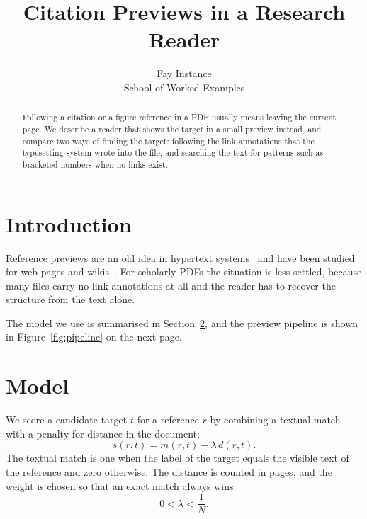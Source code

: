 \title{Citation Previews in a Research Reader}
\author{Fay Instance\\ School of Worked Examples}
\date{}


\maketitle

\begin{abstract}
Following a citation or a figure reference in a PDF usually means leaving the
current page. We describe a reader that shows the target in a small preview
instead, and compare two ways of finding the target: following the link
annotations that the typesetting system wrote into the file, and searching the
text for patterns such as bracketed numbers when no links exist.
\end{abstract}

\section{Introduction}\label{sec:intro}

Reference previews are an old idea in hypertext systems~\cite{nelson} and
have been studied for web pages and wikis~\cite{wiki,hover}. For scholarly
PDFs the situation is less settled, because many files carry no link
annotations at all and the reader has to recover the structure from the
text alone.

The model we use is summarised in Section~\ref{sec:model}, and the preview
pipeline is shown in Figure~\ref{fig:pipeline} on the next page.

\section{Model}\label{sec:model}

We score a candidate target $t$ for a reference $r$ by combining a textual
match with a penalty for distance in the document:
\begin{equation}
  s(r,t) = m(r,t) - \lambda\, d(r,t) .
  \label{eq:score}
\end{equation}
The textual match is one when the label of the target equals the visible
text of the reference and zero otherwise. The distance is counted in pages,
and the weight is chosen so that an exact match always wins:
\begin{equation}
  0 < \lambda < \frac{1}{N} .
  \label{eq:lambda}
\end{equation}

